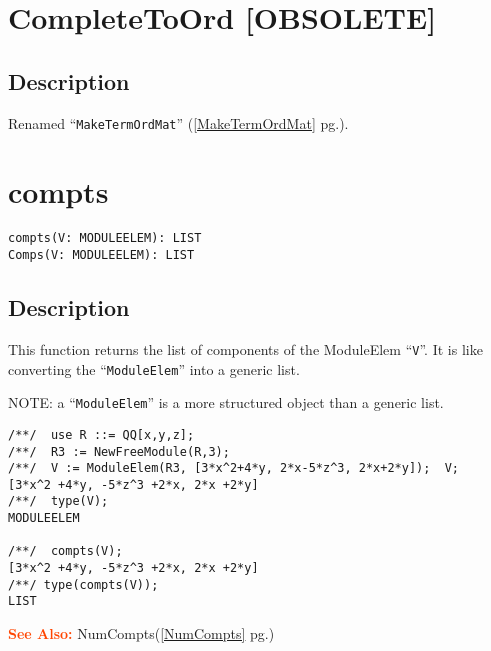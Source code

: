\documentclass[a4paper]{mybook}
\newenvironment{command}{}{} %
\newcommand\SeeAlso{\par\textcolor{OrangeRed}{\textbf{\large See Also: }}}
\begin{document}
\section{CompleteToOrd [OBSOLETE]}
\label{CompleteToOrd [OBSOLETE]}
\begin{command} %



\subsection*{Description}

Renamed ``\verb&MakeTermOrdMat&'' (\ref{MakeTermOrdMat} pg.\pageref{MakeTermOrdMat}).

\end{command} %

\section{compts}
\label{compts}
\begin{command} %


\begin{Verbatim}[label=syntax, rulecolor=\color{MidnightBlue},
frame=single]
compts(V: MODULEELEM): LIST
Comps(V: MODULEELEM): LIST
\end{Verbatim}


\subsection*{Description}

This function returns the list of components of the ModuleElem ``\verb&V&''.
It is like converting the ``\verb&ModuleElem&'' into a generic list.
\par 
NOTE: a ``\verb&ModuleElem&'' is a more structured object than a generic list.
\begin{Verbatim}[label=example, rulecolor=\color{PineGreen}, frame=single]
/**/  use R ::= QQ[x,y,z];
/**/  R3 := NewFreeModule(R,3);
/**/  V := ModuleElem(R3, [3*x^2+4*y, 2*x-5*z^3, 2*x+2*y]);  V;
[3*x^2 +4*y, -5*z^3 +2*x, 2*x +2*y]
/**/  type(V);
MODULEELEM

/**/  compts(V);
[3*x^2 +4*y, -5*z^3 +2*x, 2*x +2*y]
/**/ type(compts(V));
LIST
\end{Verbatim}


\SeeAlso %
  NumCompts(\ref{NumCompts} pg.\pageref{NumCompts})
\end{command} %
\end{document}
